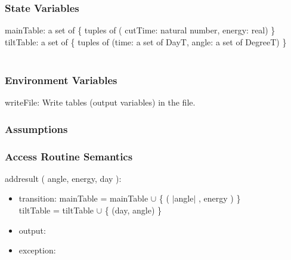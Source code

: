 \documentclass[12pt, titlepage]{article}
\begin{document}
\subsubsection{State Variables}

mainTable: a set of \{ tuples of ( 
cutTime: natural number, energy: real) \}\\
tiltTable: a set of \{ tuples of (time: a set of DayT, angle: a set of DegreeT) \}\\\\


\subsubsection{Environment Variables}
writeFile: Write tables  (output variables) in the file. 

\subsubsection{Assumptions}


\subsubsection{ Access Routine Semantics}

\noindent  addresult ( angle, energy, day ):
\begin{itemize}
\item transition: mainTable = mainTable $\cup$ \{ ( $|$angle$|$ , energy )  \}\\
tiltTable = tiltTable $\cup$ \{ (day, angle) \}
\item output:
\item exception: 
\end{itemize}
\end{document}
